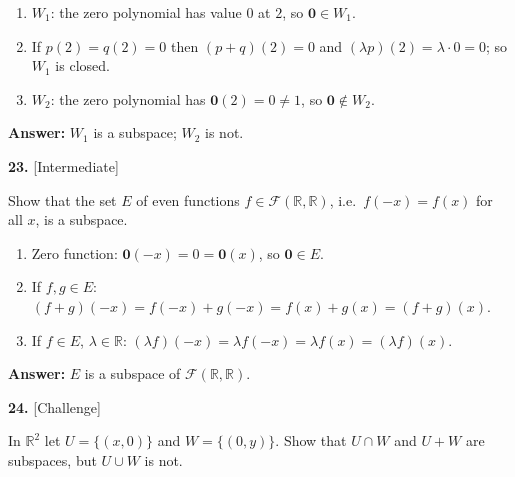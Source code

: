 \documentclass[11pt]{article}
\begin{document}
\begin{tcolorbox}[breakable,colback=ans,colframe=ansb,boxrule=0.5pt,left=4pt,right=4pt,top=2pt,bottom=2pt]\begin{enumerate}[leftmargin=2.2em,itemsep=1pt,topsep=1pt,label=\textbf{Step \arabic*.}]\item $W_1$: the zero polynomial has value $0$ at $2$, so $\mathbf 0\in W_1$.
\item If $p(2)=q(2)=0$ then $(p+q)(2)=0$ and $(\lambda p)(2)=\lambda\cdot0=0$; so $W_1$ is closed.
\item $W_2$: the zero polynomial has $\mathbf 0(2)=0\neq1$, so $\mathbf 0\notin W_2$.
\end{enumerate}\textbf{Answer:} $W_1$ is a subspace; $W_2$ is not.\end{tcolorbox}
\par\vspace{2pt}
\begin{minipage}{\linewidth}\textbf{23.} \hfill{\scriptsize\color{ink}[Intermediate]}\par\nopagebreak Show that the set $E$ of even functions $f\in\mathcal F(\mathbb{R},\mathbb{R})$, i.e.\ $f(-x)=f(x)$ for all $x$, is a subspace.
\end{minipage}\par\nopagebreak
\begin{tcolorbox}[breakable,colback=ans,colframe=ansb,boxrule=0.5pt,left=4pt,right=4pt,top=2pt,bottom=2pt]\begin{enumerate}[leftmargin=2.2em,itemsep=1pt,topsep=1pt,label=\textbf{Step \arabic*.}]\item Zero function: $\mathbf 0(-x)=0=\mathbf 0(x)$, so $\mathbf 0\in E$.
\item If $f,g\in E$: $(f+g)(-x)=f(-x)+g(-x)=f(x)+g(x)=(f+g)(x)$.
\item If $f\in E$, $\lambda\in\mathbb{R}$: $(\lambda f)(-x)=\lambda f(-x)=\lambda f(x)=(\lambda f)(x)$.
\end{enumerate}\textbf{Answer:} $E$ is a subspace of $\mathcal F(\mathbb{R},\mathbb{R})$.\end{tcolorbox}
\par\vspace{2pt}
\begin{minipage}{\linewidth}\textbf{24.} \hfill{\scriptsize\color{ink}[Challenge]}\par\nopagebreak In $\mathbb{R}^{2}$ let $U=\{(x,0)\}$ and $W=\{(0,y)\}$. Show that $U\cap W$ and $U+W$ are subspaces, but $U\cup W$ is not.
\end{minipage}\par\nopagebreak
\end{document}
